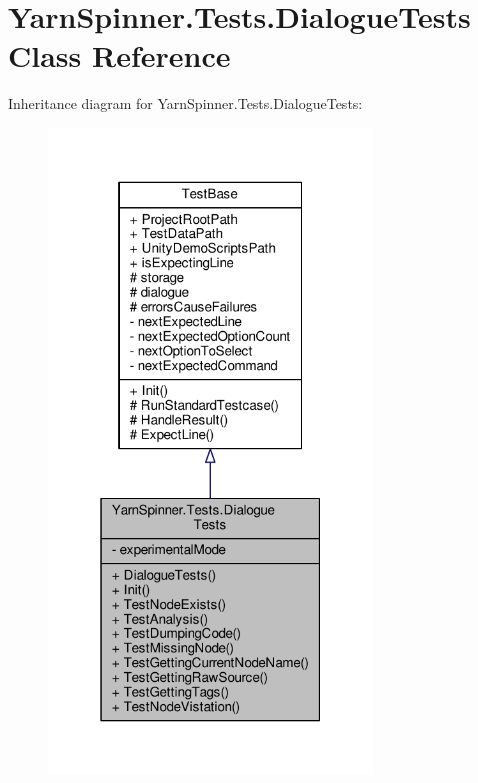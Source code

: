\hypertarget{a00096}{\section{Yarn\-Spinner.\-Tests.\-Dialogue\-Tests Class Reference}
\label{a00096}
}


Inheritance diagram for Yarn\-Spinner.\-Tests.\-Dialogue\-Tests\-:
\nopagebreak
\begin{figure}[H]
\begin{center}
\leavevmode
\includegraphics[width=244pt]{a00819}
\end{center}
\end{figure}


